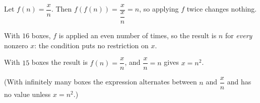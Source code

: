 Let $f(n)=\dfrac {x}{n}$. Then $f(f(n))=\dfrac{x}{\dfrac {x}{n}}=n$, so applying $f$ twice changes nothing.

With $16$ boxes, $f$ is applied an even number of times, so the result is $n$ for \emph{every} nonzero $x$: the condition puts no restriction on $x$.

With $15$ boxes the result is $f(n)=\dfrac {x}{n}$, and $\dfrac {x}{n}=n$ gives $x=n^2$.

(With infinitely many boxes the expression alternates between $n$ and $\dfrac {x}{n}$ and has no value unless $x=n^2$.)
